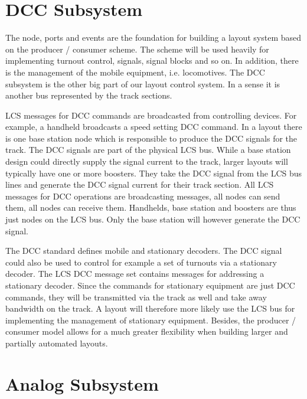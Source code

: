 \section{DCC Subsystem}

The node, ports and events are the foundation for building a layout system based on the producer / consumer scheme. The scheme will be used heavily for implementing turnout control, signals, signal blocks and so on. In addition, there is the management of the mobile equipment, i.e. locomotives. The DCC subsystem is the other big part of our layout control system. In a sense it is another bus represented by the track sections.

LCS messages for DCC commands are broadcasted from controlling devices. For example, a handheld broadcasts a speed setting DCC command. In a layout there is one base station node which is responsible to produce the DCC signals for the track. The DCC signals are part of the physical LCS bus. While a base station design could directly supply the signal current to the track, larger layouts will typically have one or more boosters. They take the DCC signal from the LCS bus lines and generate the DCC signal current for their track section. All LCS messages for DCC operations are broadcasting messages, all nodes can send them, all nodes can receive them. Handhelds, base station and boosters are thus just nodes on the LCS bus. Only the base station will however generate the DCC signal.

The DCC standard defines mobile and stationary decoders. The DCC signal could also be used to control for example a set of turnouts via a stationary decoder. The LCS DCC  message set contains messages for addressing a stationary decoder. Since the commands for stationary equipment are just DCC commands, they will be transmitted via the track as well and take away bandwidth on the track. A layout will therefore more likely use the LCS bus for implementing the management of stationary equipment. Besides, the producer / consumer model allows for a much greater flexibility when building larger and partially automated layouts.

\section{Analog Subsystem}

